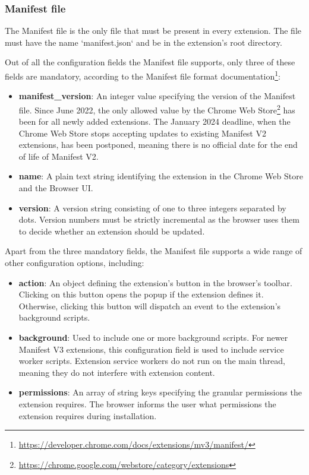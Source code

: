\subsubsection{Manifest file}

The Manifest file is the only file that must be present in every extension. The file must have the name `manifest.json` and be in the extension's root directory.

Out of all the configuration fields the Manifest file supports, only three of these fields are mandatory, according to the Manifest file format documentation\footnote{\url{https://developer.chrome.com/docs/extensions/mv3/manifest/}}:

\begin{itemize}
	\item \textbf{manifest\_version}: An integer value specifying the version of the Manifest file. Since June 2022, the only allowed value by the Chrome Web Store\footnote{{\url{https://chrome.google.com/webstore/category/extensions}}} has been  for all newly added extensions. The January 2024 deadline, when the Chrome Web Store stops accepting updates to existing Manifest V2 extensions, has been postponed, meaning there is no official date for the end of life of Manifest V2.
	\item \textbf{name}: A plain text string identifying the extension in the Chrome Web Store and the Browser UI.
	\item \textbf{version}: A version string consisting of one to three integers separated by dots. Version numbers must be strictly incremental as the browser uses them to decide whether an extension should be updated.
\end{itemize}

Apart from the three mandatory fields, the Manifest file supports a wide range of other configuration options, including:

\begin{itemize}
	\item \textbf{action}: An object defining the extension's button in the browser's toolbar. Clicking on this button opens the popup if the extension defines it. Otherwise, clicking this button will dispatch an event to the extension's background scripts.
	\item \textbf{background}: Used to include one or more background scripts. For newer Manifest V3 extensions, this configuration field is used to include service worker scripts. Extension service workers do not run on the main thread, meaning they do not interfere with extension content.
	\item \textbf{permissions}: An array of string keys specifying the granular permissions the extension requires. The browser informs the user what permissions the extension requires during installation.
\end{itemize}


